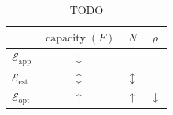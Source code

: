 \documentclass[11pt,a4paper]{article}
\numberwithin{equation}{section}
\newcommand{\capacity}{\operatorname{capacity}}
\newcommand{\apperr}{\mathcal{E}_{\mathrm{app}}}
\newcommand{\esterr}{\mathcal{E}_{\mathrm{est}}}
\newcommand{\opterr}{\mathcal{E}_{\mathrm{opt}}}
\begin{document}
\begin{table}
\centering
\begin{tabular}{lccc}
\toprule
& $\capacity(F)$ & $N$ & $\rho$ \\
\midrule
$\apperr$ & $\downarrow$ & \text{---} & \text{---} \\
$\esterr$ & $\updownarrow$ & $\updownarrow$ & \text{---} \\
$\opterr$ & $\uparrow$ & $\uparrow$ & $\downarrow$ \\
\bottomrule
\end{tabular}
\caption{TODO}
\end{table}



\end{document}

